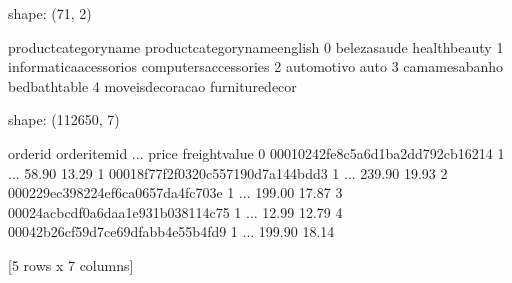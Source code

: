 \documentclass[letterpaper,10pt,english]{jupyterBook}
\begin{document}
\begin{sphinxVerbatim}[commandchars=\\\{\}]
  
  
\end{sphinxVerbatim}

\begin{sphinxVerbatim}[commandchars=\\\{\}]
shape: (71, 2)
\end{sphinxVerbatim}

\begin{sphinxVerbatim}[commandchars=\\\{\}]
    product\PYGZus{}category\PYGZus{}name product\PYGZus{}category\PYGZus{}name\PYGZus{}english
0            beleza\PYGZus{}saude                 health\PYGZus{}beauty
1  informatica\PYGZus{}acessorios         computers\PYGZus{}accessories
2              automotivo                          auto
3         cama\PYGZus{}mesa\PYGZus{}banho                bed\PYGZus{}bath\PYGZus{}table
4        moveis\PYGZus{}decoracao               furniture\PYGZus{}decor
\end{sphinxVerbatim}

\begin{sphinxVerbatim}[commandchars=\\\{\}]
  
  
\end{sphinxVerbatim}

\begin{sphinxVerbatim}[commandchars=\\\{\}]
shape: (112650, 7)
\end{sphinxVerbatim}

\begin{sphinxVerbatim}[commandchars=\\\{\}]
                           order\PYGZus{}id  order\PYGZus{}item\PYGZus{}id  ...   price freight\PYGZus{}value
0  00010242fe8c5a6d1ba2dd792cb16214              1  ...   58.90         13.29
1  00018f77f2f0320c557190d7a144bdd3              1  ...  239.90         19.93
2  000229ec398224ef6ca0657da4fc703e              1  ...  199.00         17.87
3  00024acbcdf0a6daa1e931b038114c75              1  ...   12.99         12.79
4  00042b26cf59d7ce69dfabb4e55b4fd9              1  ...  199.90         18.14

[5 rows x 7 columns]
\end{sphinxVerbatim}
\end{document}
